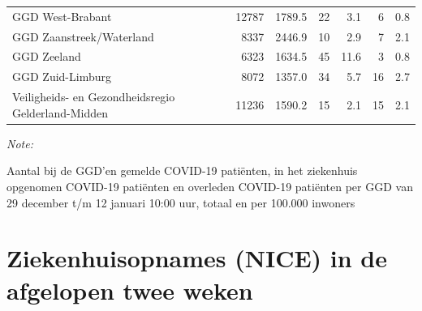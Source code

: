 \documentclass[
  english,
  man,floatsintext]{apa6}
\begin{document}
\begin{table}
\begin{threeparttable}
\begin{tabular}{lrrrrrr}
GGD West-Brabant & 12787 & 1789.5 & 22 & 3.1 & 6 & 0.8\\
GGD Zaanstreek/Waterland & 8337 & 2446.9 & 10 & 2.9 & 7 & 2.1\\
GGD Zeeland & 6323 & 1634.5 & 45 & 11.6 & 3 & 0.8\\
GGD Zuid-Limburg & 8072 & 1357.0 & 34 & 5.7 & 16 & 2.7\\
Veiligheids- en Gezondheidsregio Gelderland-Midden & 11236 & 1590.2 & 15 & 2.1 & 15 & 2.1\\
\bottomrule
\end{tabular}
\begin{tablenotes}
\item \textit{Note: } 
\item Aantal bij de GGD’en gemelde COVID-19 patiënten, in het ziekenhuis opgenomen COVID-19 patiënten en overleden COVID-19 patiënten per GGD van 29 december t/m 12 januari 10:00 uur, totaal en per 100.000 inwoners
\end{tablenotes}
\end{threeparttable}
\endgroup{}
\end{table}

\newpage

\hypertarget{ziekenhuisopnames-nice-in-de-afgelopen-twee-weken}{%
\section{Ziekenhuisopnames (NICE) in de afgelopen twee weken}\label{ziekenhuisopnames-nice-in-de-afgelopen-twee-weken}}
\end{document}
